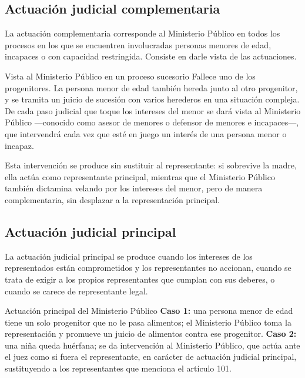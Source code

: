\documentclass[12pt,oneside]{book}
\begin{document}
\subsection{Actuación judicial complementaria}

La actuación complementaria corresponde al Ministerio Público en todos los procesos en los que se encuentren involucradas personas menores de edad, incapaces o con capacidad restringida. Consiste en darle vista de las actuaciones.

\begin{example}{Vista al Ministerio Público en un proceso sucesorio}
Fallece uno de los progenitores. La persona menor de edad también hereda junto al otro progenitor, y se tramita un juicio de sucesión con varios herederos en una situación compleja. De cada paso judicial que toque los intereses del menor se dará vista al Ministerio Público —conocido como asesor de menores o defensor de menores e incapaces—, que intervendrá cada vez que esté en juego un interés de una persona menor o incapaz.
\end{example}

Esta intervención se produce sin sustituir al representante: si sobrevive la madre, ella actúa como representante principal, mientras que el Ministerio Público también dictamina velando por los intereses del menor, pero de manera complementaria, sin desplazar a la representación principal.

\subsection{Actuación judicial principal}

La actuación judicial principal se produce cuando los intereses de los representados están comprometidos y los representantes no accionan, cuando se trata de exigir a los propios representantes que cumplan con sus deberes, o cuando se carece de representante legal.

\begin{example}{Actuación principal del Ministerio Público}
\textbf{Caso 1:} una persona menor de edad tiene un solo progenitor que no le pasa alimentos; el Ministerio Público toma la representación y promueve un juicio de alimentos contra ese progenitor. \textbf{Caso 2:} una niña queda huérfana; se da intervención al Ministerio Público, que actúa ante el juez como si fuera el representante, en carácter de actuación judicial principal, sustituyendo a los representantes que menciona el artículo 101.
\end{example}
\end{document}
